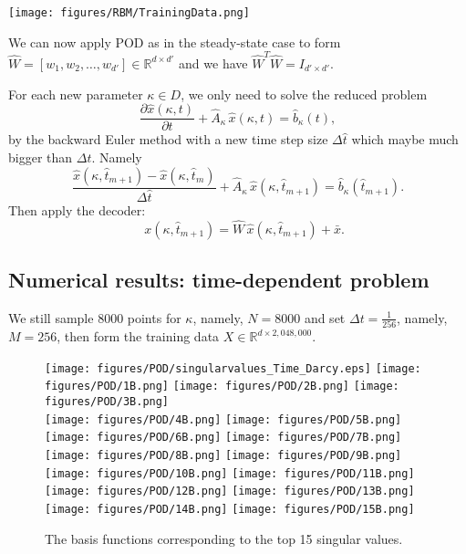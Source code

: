 \begin{center}
   \texttt{[image: figures/RBM/TrainingData.png]}
\end{center}
We can now apply POD as in the steady-state case to
form $\hat W=[w_1, w_2, \ldots, w_{d'}]\in \mathbb{R}^{d\times d'}$ and we have $\hat W^T\hat W=I_{d'\times d'}$. 

For each new parameter $\kappa\in D$, we only need to solve the reduced problem
\begin{equation}
\frac{\partial  \hat{x}(\kappa, t)}{\partial t}+ \hat{A}_\kappa \, \hat{x}(\kappa,t)  =\hat{b}_{\kappa}(t),
\end{equation}
by the backward Euler method with a new time step size $\Delta \hat t$ which maybe much bigger than $\Delta t$.
Namely 
\begin{equation}
\frac{\hat{x}(\kappa, \hat t_{m+1})-\hat{x}(\kappa, \hat t_{m})}{\Delta \hat t}+\hat{A}_\kappa \, \hat{x}(\kappa, \hat t_{m+1})=\hat{b}_{\kappa}(\hat t_{m+1}).
\end{equation}
Then apply the decoder:
$$
\quad x(\kappa, \hat t_{m+1} )=\hat W \, \hat x(\kappa, \hat t_{m+1}) + \bar{x}. 
$$

\subsection{Numerical results: time-dependent problem}
We still sample 8000 points for $\kappa$, namely, $N=8000$ and set $\Delta t = \frac{1}{256}$, namely, $M=256$, then form the training data $X \in \mathbb{R}^{d \times 2,048,000}$.
\begin{figure}[!htbp]
	\centering 
	\texttt{[image: figures/POD/singularvalues\_Time\_Darcy.eps]}
	\texttt{[image: figures/POD/1B.png]}
	\texttt{[image: figures/POD/2B.png]}
	\texttt{[image: figures/POD/3B.png]}
	\\
	\texttt{[image: figures/POD/4B.png]}
	\texttt{[image: figures/POD/5B.png]}
	\texttt{[image: figures/POD/6B.png]}
	\texttt{[image: figures/POD/7B.png]}
	\\
	\texttt{[image: figures/POD/8B.png]}
	\texttt{[image: figures/POD/9B.png]}
	\texttt{[image: figures/POD/10B.png]}
	\texttt{[image: figures/POD/11B.png]}
	\\
	\texttt{[image: figures/POD/12B.png]}
	\texttt{[image: figures/POD/13B.png]}
	\texttt{[image: figures/POD/14B.png]}
	\texttt{[image: figures/POD/15B.png]}
	\caption{The basis functions corresponding to the top 15 singular values.}
\end{figure}


